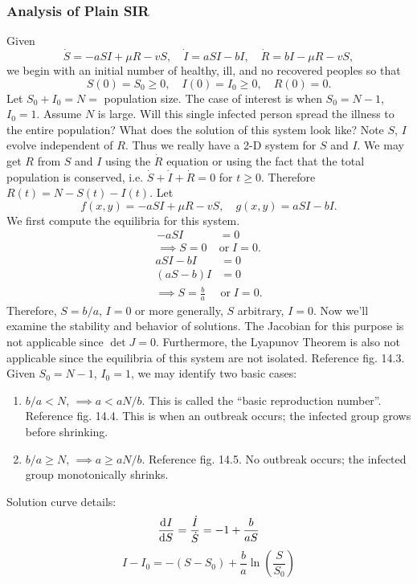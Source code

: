 \documentclass[12pt,twoside]{article}
\begin{document}
\subsubsection{Analysis of Plain SIR}
Given
\begin{equation*}
  \dot{S}=-aSI+\mu R-vS,\quad\dot{I}=aSI-bI,\quad\dot{R}=bI-\mu R-vS,
\end{equation*}
we begin with an initial number of healthy, ill, and no recovered peoples so that
\begin{equation*}
  S(0)=S_0\ge0,\quad I(0)=I_0\ge0,\quad R(0)=0.
\end{equation*}
Let $S_0+I_0=N=$ population size. The case of interest is when $S_0=N-1$,
$I_0=1$. Assume $N$ is large. Will this single infected person spread the
illness to the entire population? What does the solution of this system look
like? Note $S$, $I$ evolve independent of $R$. Thus we really have a 2-D system
for $S$ and $I$. We may get $R$ from $S$ and $I$ using the $\dot{R}$ equation or
using the fact that the total population is conserved, i.e.
$\dot{S}+\dot{I}+\dot{R}=0$ for $t\ge0$. Therefore $R(t)=N-S(t)-I(t)$. Let
\begin{equation*}
  f(x,y)=-aSI+\mu R-vS,\quad g(x,y)=aSI-bI.
\end{equation*}
We first compute the equilibria for this system.
\begin{equation*}
  \begin{aligned}
    -aSI&=0\\\implies S=0\;&\text{or}\;I=0.
  \end{aligned}
  \end{equation*}
\begin{equation*}
  \begin{aligned}
    aSI-bI&=0 \\
    (aS-b)I&=0 \\
    \implies S=\frac{b}{a}\;&\text{or}\;I=0.
  \end{aligned}
\end{equation*}
Therefore, $S=b/a$, $I=0$ or more generally, $S$ arbitrary, $I=0$. Now we'll
examine the stability and behavior of solutions. The Jacobian for this purpose
is not applicable since $\det J=0$. Furthermore, the Lyapunov Theorem is also
not applicable since the equilibria of this system are not isolated. Reference
fig. 14.3. Given $S_0=N-1$, $I_0=1$, we may identify two basic cases:
\begin{enumerate}
\item $b/a<N$, $\implies a<aN/b$. This is called the ``basic reproduction
  number''. Reference fig. 14.4. This is when an outbreak occurs; the infected
  group grows before shrinking.
\item $b/a\ge N$, $\implies a\ge aN/b$. Reference fig. 14.5. No outbreak occurs;
  the infected group monotonically shrinks.
\end{enumerate}
Solution curve details:
\begin{equation*}
  \frac{\mathrm{d}^{} {I}}{\mathrm{d}{S}^{}} = \frac{\dot{I}}{\dot{S}}=-1+\frac{b}{aS}
\end{equation*}
\begin{equation*}
  I-I_0=-(S-S_0)+\frac{b}{a}\ln \left( \frac{S}{S_0} \right)
\end{equation*}
\end{document}
